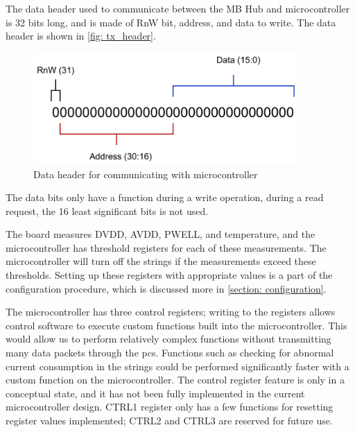 \documentclass[main.tex]{subfiles}
\begin{document}
The data header used to communicate between the MB Hub and microcontroller is 32 bits long, and is made of RnW bit, address, and data to write. The data header is shown in \autoref{fig: tx_header}.

\begin{figure}[!htpb]
    \centering
    \includegraphics[width=10cm, scale=1]{images/TX packet header.pdf}
    \caption{Data header for communicating with microcontroller}
    \label{fig: tx_header}
\end{figure}
\FloatBarrier

The data bits only have a function during a write operation, during a read request, the 16 least significant bits is not used.

The board measures DVDD, AVDD, PWELL, and temperature, and the microcontroller has threshold registers for each of these measurements. The microcontroller will turn off the strings if the measurements exceed these thresholds. Setting up these registers with appropriate values is a part of the configuration procedure, which is discussed more in \autoref{section: configuration}.

The microcontroller has three control registers; writing to the registers allows control software to execute custom functions built into the microcontroller. This would allow us to perform relatively complex functions without transmitting many data packets through the \gls{pcs}. Functions such as checking for abnormal current consumption in the strings could be performed significantly faster with a custom function on the microcontroller. The control register feature is only in a conceptual state, and it has not been fully implemented in the current microcontroller design. CTRL1 register only has a few functions for resetting register values implemented; CTRL2 and CTRL3 are reserved for future use.
\end{document}

